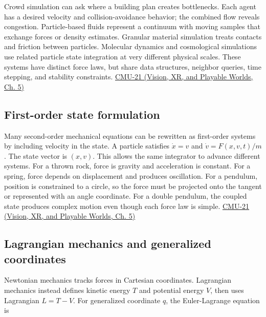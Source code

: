 Crowd simulation can ask where a building plan creates bottlenecks. Each agent has a desired velocity and collision-avoidance behavior; the combined flow reveals congestion. Particle-based fluids represent a continuum with moving samples that exchange forces or density estimates. Granular material simulation treats contacts and friction between particles. Molecular dynamics and cosmological simulations use related particle state integration at very different physical scales. These systems have distinct force laws, but share data structures, neighbor queries, time stepping, and stability constraints. \href{../07-Vision-XR-and-Playable-Worlds/main.pdf\#nameddest=04-visual-computing-ii-ch036-cmu-21---dynamics-and-time-integration}{CMU-21 (Vision, XR, and Playable Worlds, Ch. 5)}

\subsection{First-order state formulation}\label{04-visual-computing-ii-ch029-first-order-state-formulation}

Many second-order mechanical equations can be rewritten as first-order systems by including velocity in the state. A particle satisfies \(\dot x=v\) and \(\dot v=F(x,v,t)/m\). The state vector is \((x,v)\). This allows the same integrator to advance different systems. For a thrown rock, force is gravity and acceleration is constant. For a spring, force depends on displacement and produces oscillation. For a pendulum, position is constrained to a circle, so the force must be projected onto the tangent or represented with an angle coordinate. For a double pendulum, the coupled state produces complex motion even though each force law is simple. \href{../07-Vision-XR-and-Playable-Worlds/main.pdf\#nameddest=04-visual-computing-ii-ch036-cmu-21---dynamics-and-time-integration}{CMU-21 (Vision, XR, and Playable Worlds, Ch. 5)}

\subsection{Lagrangian mechanics and generalized coordinates}\label{04-visual-computing-ii-ch029-lagrangian-mechanics-and-generalized-coordinates}

Newtonian mechanics tracks forces in Cartesian coordinates. Lagrangian mechanics instead defines kinetic energy \(T\) and potential energy \(V\), then uses Lagrangian \(L=T-V\). For generalized coordinate \(q\), the Euler-Lagrange equation is


